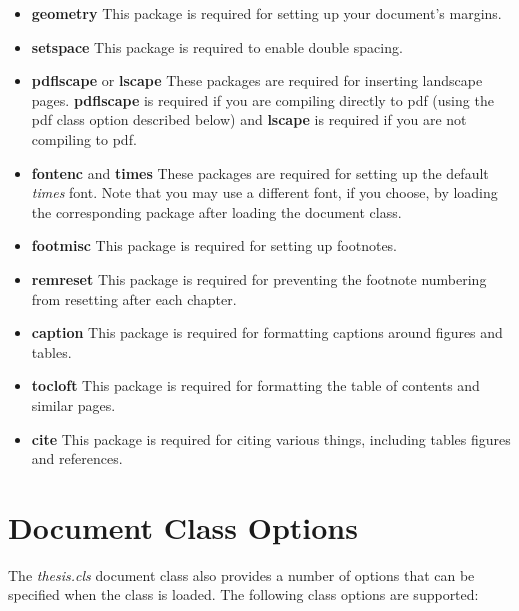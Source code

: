 \documentclass[master]{thesis}
\begin{document}
\begin{itemize}
    \item \textbf{geometry}  This package is required for setting up your document's margins.

    \item \textbf{setspace}  This package is required to enable double spacing.

    \item \textbf{pdflscape}  or \textbf{lscape}  These packages are required for inserting landscape pages.  \textbf{pdflscape} is required if you are compiling directly to pdf (using the pdf class option described below) and \textbf{lscape} is required if you are not compiling to pdf.

    \item \textbf{fontenc} and \textbf{times}  These packages are required for setting up the default \textit{times} font.  Note that you may use a different font, if you choose, by loading the corresponding package after loading the document class.

    \item \textbf{footmisc}  This package is required for setting up footnotes.

    \item \textbf{remreset}  This package is required for preventing the footnote numbering from resetting after each chapter.

    \item \textbf{caption}  This package is required for formatting captions around figures and tables.

    \item \textbf{tocloft}  This package is required for formatting the table of contents and similar pages.

    \item \textbf{cite}  This package is required for citing various things, including tables figures and references.
\end{itemize}

\section{Document Class Options}

The \textit{thesis.cls} document class also provides a number of options that can be specified when the class is loaded.  The following class options are supported:
\end{document}
